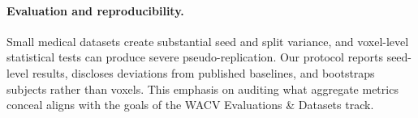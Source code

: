 \paragraph{Evaluation and reproducibility.}
Small medical datasets create substantial seed and split variance, and
voxel-level statistical tests can produce severe pseudo-replication.  Our protocol
reports seed-level results, discloses deviations from published baselines, and
bootstraps subjects rather than voxels.  This emphasis on auditing what aggregate
metrics conceal aligns with the goals of the WACV Evaluations \& Datasets track.
